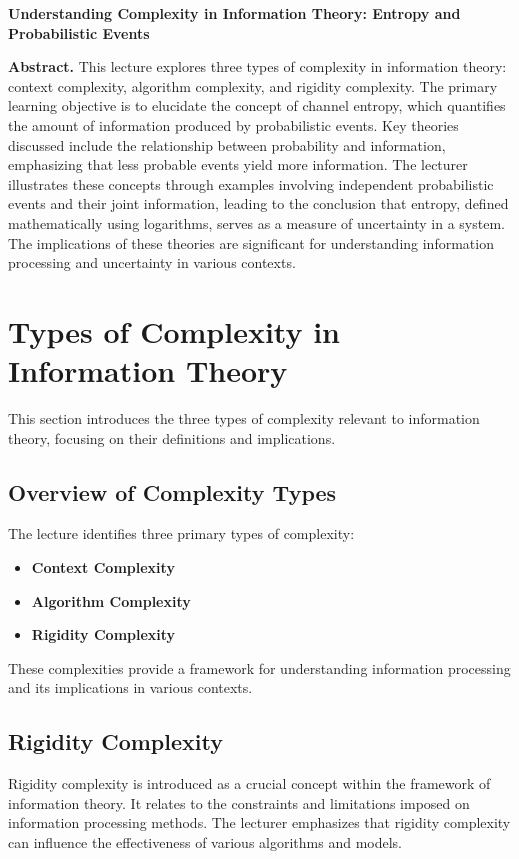 \documentclass[a4paper]{article}
\begin{document}
\begin{center}
{\LARGE \textbf{Understanding Complexity in Information Theory: Entropy and Probabilistic Events}}\\[1em]
\end{center}

\textbf{Abstract.} This lecture explores three types of complexity in information theory: context complexity, algorithm complexity, and rigidity complexity. The primary learning objective is to elucidate the concept of channel entropy, which quantifies the amount of information produced by probabilistic events. Key theories discussed include the relationship between probability and information, emphasizing that less probable events yield more information. The lecturer illustrates these concepts through examples involving independent probabilistic events and their joint information, leading to the conclusion that entropy, defined mathematically using logarithms, serves as a measure of uncertainty in a system. The implications of these theories are significant for understanding information processing and uncertainty in various contexts.

\section{Types of Complexity in Information Theory}
This section introduces the three types of complexity relevant to information theory, focusing on their definitions and implications.

\subsection{Overview of Complexity Types}
The lecture identifies three primary types of complexity:
\begin{itemize}
    \item \textbf{Context Complexity}
    \item \textbf{Algorithm Complexity}
    \item \textbf{Rigidity Complexity}
\end{itemize}
These complexities provide a framework for understanding information processing and its implications in various contexts.

\subsection{Rigidity Complexity}
Rigidity complexity is introduced as a crucial concept within the framework of information theory. It relates to the constraints and limitations imposed on information processing methods. The lecturer emphasizes that rigidity complexity can influence the effectiveness of various algorithms and models.
\end{document}
